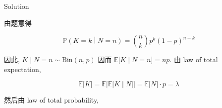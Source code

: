 \begin{qlsolution}{Solution}

由题意得

\[\left. \mathbb{P}(\mathit{K} = \mathit{k} \middle| \mathit{N} = \mathit{n}) = \binom{\mathit{n}}{\mathit{k}}\mathit{p}^{\mathit{k}}(1 - \mathit{p})^{\mathit{n} - \mathit{k}} \right.\]

因此, \(\left. \mathit{K} \middle| \mathit{N} = \mathit{n} \sim \text{Bin}(\mathit{n},\mathit{p}) \right.\) 因而 \(\left. \mathbb{E}\lbrack\mathit{K} \middle| \mathit{N} = \mathit{n}\rbrack = \mathit{n}\mathit{p} \right.\). 由 law of total expectation,

\[\left. \mathbb{E}\lbrack\mathit{K}\rbrack = \mathbb{E}\lbrack\mathbb{E}\lbrack\mathit{K} \middle| \mathit{N}\rbrack\rbrack = \mathbb{E}\lbrack\mathit{N}\rbrack \cdot \mathit{p} = \mathit{\lambda} \right.\]

然后由 law of total probability,


\end{qlsolution}
